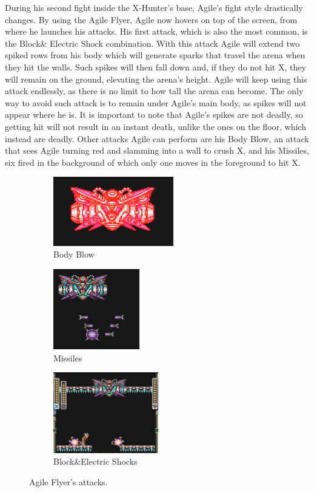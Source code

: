 During his second fight inside the X-Hunter's base, Agile's fight style drastically changes. By using the Agile Flyer, Agile now hovers on top of the screen, from where he launches his attacks. His first attack, which is also the most common, is the Block\& Electric Shock combination. With this attack Agile will extend two spiked rows from his body which will generate sparks that travel the arena when they hit the walls. Such spikes will then fall down and, if they do not hit X, they will remain on the ground, elevating the arena's height. Agile will keep using this attack endlessly, as there is no limit to how tall the arena can become. The only way to avoid such attack is to remain under Agile's main body, as spikes will not appear where he is. It is important to note that Agile's spikes are not deadly, so getting hit will not result in an instant death, unlike the ones on the floor, which instead are deadly. Other attacks Agile can perform are his Body Blow, an attack that sees Agile turning red and slamming into a wall to crush X, and his Missiles, six fired in the background of which only one moves in the foreground to hit X. 
\begin{figure}[htp]
	\centering
	\begin{subfigure}{\linewidth}
		\centering
		\includegraphics[height=3cm]{figures/X2/Hunter_stages/Agile_flyer_dash.png}
		\caption{Body Blow}	
	\end{subfigure}
	\begin{subfigure}{0.5\linewidth}
		\centering
		\includegraphics[height=3.5cm]{figures/X2/Hunter_stages/Agile_flyer_missile.png}
		\caption{Missiles}
	\end{subfigure}
	\begin{subfigure}{0.4\linewidth}
		\centering
		\includegraphics[height=3.5cm]{figures/X2/Hunter_stages/Agile_flyer_spike_shock.png}
		\caption{Block\&Electric Shocks}
	\end{subfigure}	
	\caption{Agile Flyer's attacks.}	
\end{figure}
